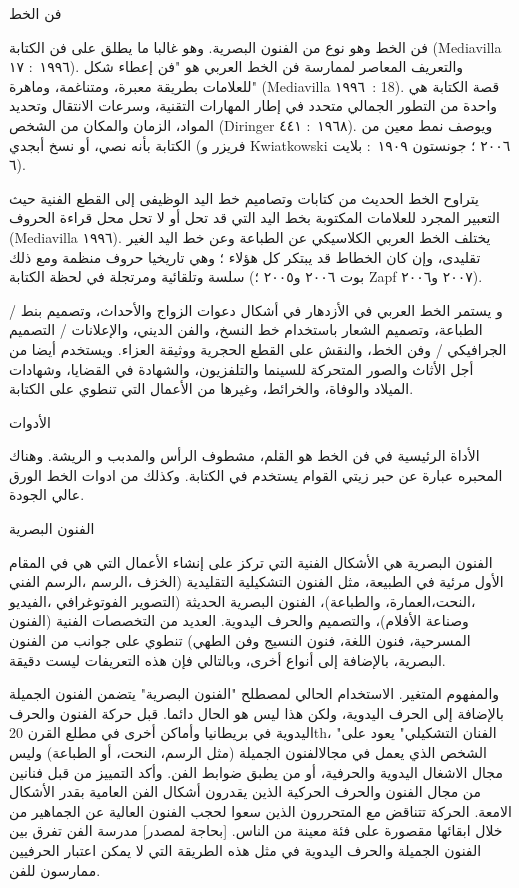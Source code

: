 \documentclass[a4paper]{article}
\begin{document}
\begin{flushright}
فن الخط

فن الخط وهو نوع من الفنون البصرية. وهو غالبا ما يطلق على فن الكتابة (Mediavilla ١٩٩٦ : ١٧). والتعريف المعاصر لممارسة فن الخط العربي هو "فن إعطاء شكل للعلامات بطريقة معبرة، ومتناغمة، وماهرة" (Mediavilla ١٩٩٦ : 18). قصة الكتابة هي واحدة من التطور الجمالي متحدد في إطار المهارات التقنية، وسرعات الانتقال وتحديد المواد، الزمان والمكان من الشخص (Diringer ١٩٦٨ : ٤٤١). ويوصف نمط معين من الكتابة بأنه نصي، أو نسخ أبجدي (فريزر و Kwiatkowski ٢٠٠٦ ؛ جونستون ١٩٠٩ : بلايت ٦).

يتراوح الخط الحديث من كتابات وتصاميم خط اليد الوظيفى إلى القطع الفنية حيث التعبير المجرد للعلامات المكتوبة بخط اليد التي قد تحل أو لا تحل محل قراءة الحروف (Mediavilla ١٩٩٦). يختلف الخط العربي الكلاسيكي عن الطباعة وعن خط اليد الغير تقليدى، وإن كان الخطاط قد يبتكر كل هؤلاء ؛ وهي تاريخيا حروف منظمة ومع ذلك سلسة وتلقائية ومرتجلة في لحظة الكتابة (بوت ٢٠٠٦ و٢٠٠٥ ؛ Zapf ٢٠٠٧ و٢٠٠٦).

و يستمر الخط العربي في الأزدهار في أشكال دعوات الزواج والأحداث، وتصميم بنط / الطباعة، وتصميم الشعار باستخدام خط النسخ، والفن الديني، والإعلانات / التصميم الجرافيكي / وفن الخط، والنقش على القطع الحجرية ووثيقة العزاء. ويستخدم أيضا من أجل الأثاث والصور المتحركة للسينما والتلفزيون، والشهادة في القضايا، وشهادات الميلاد والوفاة، والخرائط، وغيرها من الأعمال التي تنطوي على الكتابة.


الأدوات

الأداة الرئيسية في فن الخط هو القلم، مشطوف الرأس والمدبب و الريشة. وهناك المحبره عبارة عن حبر زيتي القوام يستخدم في الكتابة. وكذلك من ادوات الخط الورق عالي الجودة.



الفنون البصرية

الفنون البصرية هي الأشكال الفنية التي تركز على إنشاء الأعمال التي هي في المقام الأول مرئية في الطبيعة، مثل الفنون التشكيلية التقليدية (الخزف ،الرسم ،الرسم الفني ،النحت،العمارة، والطباعة)، الفنون البصرية الحديثة (التصوير الفوتوغرافي ،الفيديو وصناعة الأفلام)، والتصميم والحرف اليدوية. العديد من التخصصات الفنية (الفنون المسرحية، فنون اللغة، فنون النسيج وفن الطهي) تنطوي على جوانب من الفنون البصرية، بالإضافة إلى أنواع أخرى، وبالتالي فإن هذه التعريفات ليست دقيقة.

والمفهوم المتغير. الاستخدام الحالي لمصطلح "الفنون البصرية" يتضمن الفنون الجميلة بالإضافة إلى الحرف اليدوية، ولكن هذا ليس هو الحال دائما. قبل حركة الفنون والحرف اليدوية في بريطانيا وأماكن أخرى في مطلع القرن 20th، "الفنان التشكيلي" يعود على الشخص الذي يعمل في مجالالفنون الجميلة (مثل الرسم، النحت، أو الطباعة) وليس مجال الاشغال اليدوية والحرفية، أو من يطبق ضوابط الفن. وأكد التمييز من قبل فنانين من مجال الفنون والحرف الحركية الذين يقدرون أشكال الفن العامية بقدر الأشكال الامعة. الحركة تتناقض مع المتحررون الذين سعوا لحجب الفنون العالية عن الجماهير من خلال ابقائها مقصورة على فئة معينة من الناس. [بحاجة لمصدر] مدرسة الفن تفرق بين الفنون الجميلة والحرف اليدوية في مثل هذه الطريقة التي لا يمكن اعتبار الحرفيين ممارسون للفن.



\end{flushright}
\end{document}

